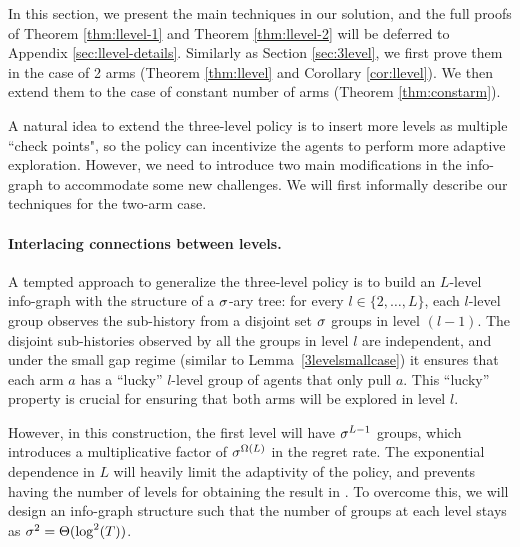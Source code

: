 In this section, we present the main techniques in our solution, and
the full proofs of Theorem \ref{thm:llevel-1} and Theorem
\ref{thm:llevel-2} will be deferred to Appendix
\ref{sec:llevel-details}. Similarly as Section \ref{sec:3level}, we
first prove them in the case of 2 arms (Theorem \ref{thm:llevel} and
Corollary \ref{cor:llevel}). We then extend them to the case of
constant number of arms (Theorem \ref{thm:constarm}).

A natural idea to extend the three-level policy is to insert more
levels as multiple ``check points", so the policy can incentivize the
agents to perform more adaptive exploration. However, we need to
introduce two main modifications in the info-graph to accommodate
some new challenges. We will first informally describe our techniques
for the two-arm case.




\paragraph{Interlacing connections between levels.}A tempted approach
to generalize the three-level policy is to build an $L$-level
info-graph with the structure of a $\sigma$-ary tree: for every
$l\in \{2, \ldots , L\}$, each $l$-level group observes the
sub-history from a disjoint set $\sigma$ groups in level $(l-1)$. The
disjoint sub-histories observed by all the groups in level $l$ are
independent, and under the small gap regime (similar to
Lemma~\ref{3levelsmallcase}) it ensures that each arm $a$ has a
``lucky'' $l$-level group of agents that only pull $a$. This ``lucky''
property is crucial for ensuring that both arms will be explored in
level $l$.

However, in this construction, the first level will have $\sigma^{L-1}$
groups, which introduces a multiplicative factor of $\sigma^{\Omega(L)}$
in the regret rate. The exponential dependence in $L$ will heavily
limit the adaptivity of the policy, and prevents having the number of
levels for obtaining the result in . To overcome
this, we will design an info-graph structure such that the number of
groups at each level stays as $\sigma^2 = \Theta(\log^2(T))$.

